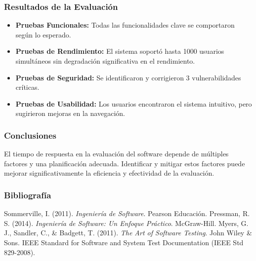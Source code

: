 \documentclass{beamer}
\begin{document}
\begin{frame}
\frametitle{Resultados de la Evaluación}
\begin{itemize}
    \item \textbf{Pruebas Funcionales:} Todas las funcionalidades clave se comportaron según lo esperado.
    \item \textbf{Pruebas de Rendimiento:} El sistema soportó hasta 1000 usuarios simultáneos sin degradación significativa en el rendimiento.
    \item \textbf{Pruebas de Seguridad:} Se identificaron y corrigieron 3 vulnerabilidades críticas.
    \item \textbf{Pruebas de Usabilidad:} Los usuarios encontraron el sistema intuitivo, pero sugirieron mejoras en la navegación.
\end{itemize}
\end{frame}

\begin{frame}
\frametitle{Conclusiones}
El tiempo de respuesta en la evaluación del software depende de múltiples factores y una planificación adecuada. Identificar y mitigar estos factores puede mejorar significativamente la eficiencia y efectividad de la evaluación.
\end{frame}

\begin{frame}
\frametitle{Bibliografía}
\begin{thebibliography}{9}
     Sommerville, I. (2011). \textit{Ingeniería de Software}. Pearson Educación.
     Pressman, R. S. (2014). \textit{Ingeniería de Software: Un Enfoque Práctico}. McGraw-Hill.
     Myers, G. J., Sandler, C., \& Badgett, T. (2011). \textit{The Art of Software Testing}. John Wiley \& Sons.
     IEEE Standard for Software and System Test Documentation (IEEE Std 829-2008).
\end{thebibliography}
\end{frame}
\end{document}

